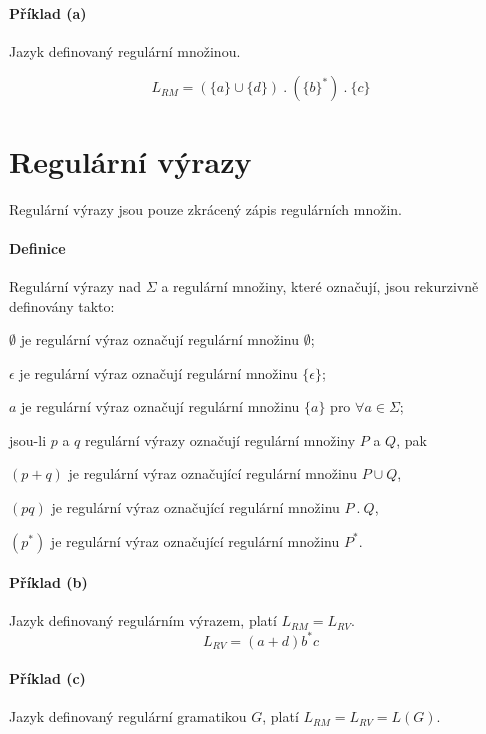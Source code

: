 \paragraph*{Příklad (a)} Jazyk definovaný regulární množinou.

$$L_{RM} = ( \{ a \} \cup \{ d \} ) ~.~ ( \{ b \}^* ) ~.~ \{ c \}$$


\section{Regulární výrazy}

Regulární výrazy jsou pouze zkrácený zápis regulárních množin.

\paragraph*{Definice} Regulární výrazy nad $\Sigma$ a regulární množiny, které označují, jsou rekurzivně definovány takto: \begin{compactitem}
    \item $\emptyset$ je regulární výraz označují regulární množinu $\emptyset$;
    \item $\epsilon$ je regulární výraz označují regulární množinu $\{ \epsilon \}$;
    \item $a$ je regulární výraz označují regulární množinu $\{ a \}$ pro $\forall a \in \Sigma$;
    \item jsou-li $p$ a $q$ regulární výrazy označují regulární množiny $P$ a $Q$, pak \begin{compactitem}
        \item $(p + q)$ je regulární výraz označující regulární množinu $P \cup Q$,
        \item $(pq)$ je regulární výraz označující regulární množinu $P ~.~ Q$,
        \item $(p^*)$ je regulární výraz označující regulární množinu $P^*$.
    \end{compactitem}
\end{compactitem}

\paragraph*{Příklad (b)} Jazyk definovaný regulárním výrazem, platí $L_{RM} = L_{RV}$. $$L_{RV} = (a + d) b^* c$$

\paragraph*{Příklad (c)} Jazyk definovaný regulární gramatikou $G$, platí $L_{RM} = L_{RV} = L(G)$.

